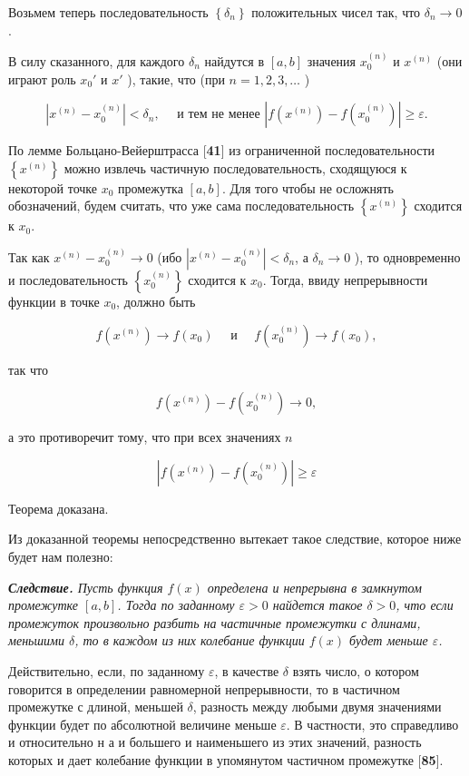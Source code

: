\documentclass[10pt, twoside]{article}
\begin{document}
Возьмем теперь последовательность $\left\{\delta_{n}\right\}$ положительных чисел так, что $\delta_{n} \to 0$.

В силу сказанного, для каждого $\delta_{n}$ найдутся в $[a, b]$ значения $x_{0}^{(n)}$ и $x^{(n)}$ (они играют роль $x_{0}'$ и $x'$ ), такие, что (при $n=1,2,3, \ldots$ )

$$
  \left|x^{(n)}-x_{0}^{(n)}\right|<\delta_{n}, \quad \text { и тем не менее }\left|f\left(x^{(n)}\right)-f\left(x_{0}^{(n)}\right)\right| \geqslant \varepsilon .
$$

По лемме Больцано-Вейерштрасса [\textbf{41}] из ограниченной последовательности $\left\{x^{(n)}\right\}$ можно извлечь частичную последовательность, сходящуюся к некоторой точке $x_{0}$ промежутка $[a, b]$. Для того чтобы не осложнять обозначений, будем считать, что уже сама последовательность $\left\{x^{(n)}\right\}$ сходится к $x_{0}$.

Так как $x^{(n)}-x_{0}^{(n)} \to 0$ (ибо $\left|x^{(n)}-x_{0}^{(n)}\right|<\delta_{n}$, а $\delta_{n} \to 0$ ), то одновременно и последовательность $\left\{x_{0}^{(n)}\right\}$ сходится к $x_{0}$. Тогда, ввиду непрерывности функции в точке $x_{0}$, должно быть

$$
  f\left(x^{(n)}\right) \to f\left(x_{0}\right) \quad \text { и } \quad f\left(x_{0}^{(n)}\right) \to f\left(x_{0}\right),
$$

так что

$$
  f\left(x^{(n)}\right)-f\left(x_{0}^{(n)}\right) \to 0,
$$

а это противоречит тому, что при всех значениях $n$

$$
  \left|f\left(x^{(n)}\right)-f\left(x_{0}^{(n)}\right)\right| \geqslant \varepsilon
$$

Теорема доказана.

Из доказанной теоремы непосредственно вытекает такое следствие, которое ниже будет нам полезно:

\textit{\textbf{Следствие.} Пусть функция $f(x)$ определена и непрерывна в замкнутом промежутке $[a, b]$. Тогда по заданному $\varepsilon>0$ найдется такое $\delta>0$, что если промежуток произвольно разбить на частичные промежутки с длинами, меньшими $\delta$, то в каждом из них колебание функции $f(x)$ будет меньше $\varepsilon$.}

Действительно, если, по заданному $\varepsilon$, в качестве $\delta$ взять число, о котором говорится в определении равномерной непрерывности, то в частичном промежутке с длиной, меньшей $\delta$, разность между любыми двумя значениями функции будет по абсолютной величине меньше $\varepsilon$. В частности, это справедливо и относительно н а и большего и наименьшего из этих значений, разность которых и дает колебание функции в упомянутом частичном промежутке [\textbf{85}].
\end{document}
